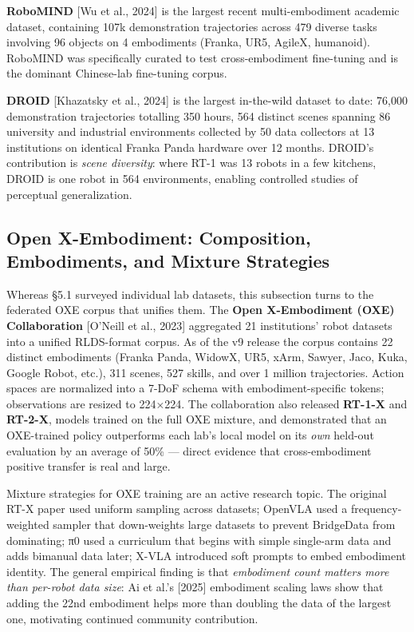 \textbf{RoboMIND} {[}Wu et al., 2024{]} is the largest recent multi-embodiment academic dataset, containing 107k demonstration trajectories across 479 diverse tasks involving 96 objects on 4 embodiments (Franka, UR5, AgileX, humanoid). RoboMIND was specifically curated to test cross-embodiment fine-tuning and is the dominant Chinese-lab fine-tuning corpus.

\textbf{DROID} {[}Khazatsky et al., 2024{]} is the largest in-the-wild dataset to date: 76,000 demonstration trajectories totalling 350 hours, 564 distinct scenes spanning 86 university and industrial environments collected by 50 data collectors at 13 institutions on identical Franka Panda hardware over 12 months. DROID's contribution is \emph{scene diversity}: where RT-1 was 13 robots in a few kitchens, DROID is one robot in 564 environments, enabling controlled studies of perceptual generalization.

\subsection{Open X-Embodiment: Composition, Embodiments, and Mixture Strategies}\label{open-x-embodiment-composition-embodiments-and-mixture-strategies}

Whereas §5.1 surveyed individual lab datasets, this subsection turns to the federated OXE corpus that unifies them. The \textbf{Open X-Embodiment (OXE) Collaboration} {[}O'Neill et al., 2023{]} aggregated 21 institutions' robot datasets into a unified RLDS-format corpus. As of the v9 release the corpus contains 22 distinct embodiments (Franka Panda, WidowX, UR5, xArm, Sawyer, Jaco, Kuka, Google Robot, etc.), 311 scenes, 527 skills, and over 1 million trajectories. Action spaces are normalized into a 7-DoF schema with embodiment-specific tokens; observations are resized to 224×224. The collaboration also released \textbf{RT-1-X} and \textbf{RT-2-X}, models trained on the full OXE mixture, and demonstrated that an OXE-trained policy outperforms each lab's local model on its \emph{own} held-out evaluation by an average of 50\% --- direct evidence that cross-embodiment positive transfer is real and large.

Mixture strategies for OXE training are an active research topic. The original RT-X paper used uniform sampling across datasets; OpenVLA used a frequency-weighted sampler that down-weights large datasets to prevent BridgeData from dominating; π0 used a curriculum that begins with simple single-arm data and adds bimanual data later; X-VLA introduced soft prompts to embed embodiment identity. The general empirical finding is that \emph{embodiment count matters more than per-robot data size}: Ai et al.'s {[}2025{]} embodiment scaling laws show that adding the 22nd embodiment helps more than doubling the data of the largest one, motivating continued community contribution.

